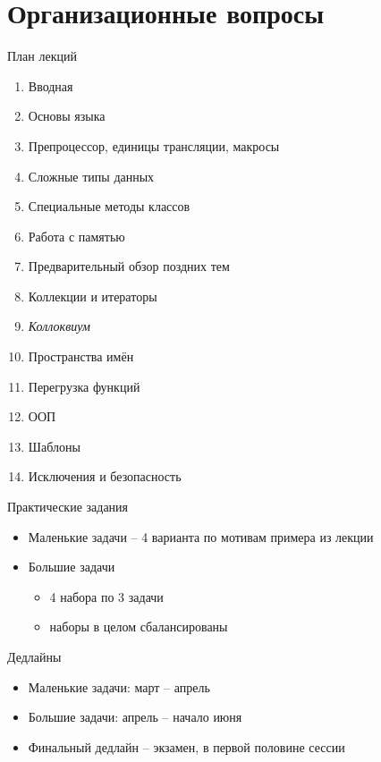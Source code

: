 \documentclass[unknownkeysallowed,xcolor=table]{beamer}
\begin{document}
\section{Организационные вопросы}

\begin{frame}{План лекций}
  \begin{enumerate}
    \item Вводная
    \item Основы языка
    \item Препроцессор, единицы трансляции, макросы
    \item Сложные типы данных
    \item Специальные методы классов
    \item Работа с памятью
    \item Предварительный обзор поздних тем
    \item Коллекции и итераторы
    \item \emph{Коллоквиум}
    \item Пространства имён
    \item Перегрузка функций
    \item ООП
    \item Шаблоны
    \item Исключения и безопасность
  \end{enumerate}
\end{frame}

\begin{frame}{Практические задания}
  \begin{itemize}
    \item Маленькие задачи -- 4 варианта по мотивам примера из лекции \vspace{2em}
    \item Большие задачи
      \begin{itemize}
        \item 4 набора по 3 задачи \vspace{1em}
        \item наборы в целом сбалансированы
      \end{itemize}
  \end{itemize}
\end{frame}

\begin{frame}{Дедлайны}
  \begin{itemize}
    \item Маленькие задачи: март -- апрель \vspace{2em}
    \item Большие задачи: апрель -- начало июня \vspace{2em}
    \item Финальный дедлайн -- экзамен, в первой половине сессии
  \end{itemize}
\end{frame}
\end{document}
